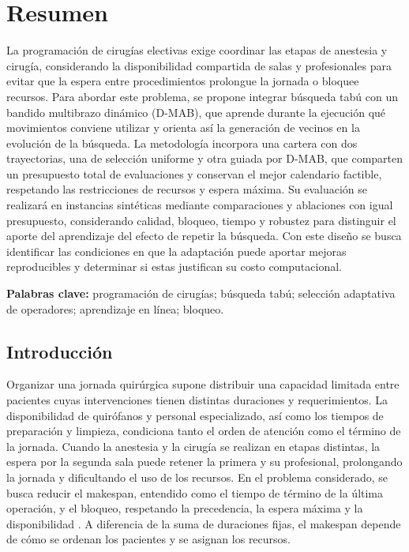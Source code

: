 \documentclass[12pt,letterpaper]{report}
\begin{document}
\hypersetup{pageanchor=false}

\hypersetup{pageanchor=true}

\chapter*{Resumen}
La programación de cirugías electivas exige coordinar las etapas de anestesia
y cirugía, considerando la disponibilidad compartida de salas y profesionales
para evitar que la espera entre procedimientos prolongue la jornada o bloquee
recursos. Para abordar este problema, se propone integrar búsqueda tabú con
un bandido multibrazo dinámico (D-MAB), que aprende durante la ejecución qué
movimientos conviene utilizar y orienta así la generación de vecinos en la
evolución de la búsqueda. La metodología incorpora una cartera con dos
trayectorias, una de selección uniforme y otra guiada por D-MAB, que comparten
un presupuesto total de evaluaciones y conservan el mejor calendario factible,
respetando las restricciones de recursos y espera máxima. Su evaluación se
realizará en instancias sintéticas mediante comparaciones y ablaciones con
igual presupuesto, considerando calidad, bloqueo, tiempo y robustez para
distinguir el aporte del aprendizaje del efecto de repetir la búsqueda.
Con este diseño se busca identificar las condiciones en que la adaptación
puede aportar mejoras reproducibles y determinar si estas justifican su
costo computacional.

\noindent\textbf{Palabras clave:} programación de cirugías; búsqueda tabú;
selección adaptativa de operadores; aprendizaje en línea; bloqueo.

\clearpage
\section{Introducción}
Organizar una jornada quirúrgica supone distribuir una capacidad limitada
entre pacientes cuyas intervenciones tienen distintas duraciones y
requerimientos. La disponibilidad de quirófanos y personal especializado,
así como los tiempos de preparación y limpieza, condiciona tanto el orden
de atención como el término de la jornada. Cuando la anestesia y la cirugía se realizan en
etapas distintas, la espera por la segunda sala puede retener la primera
y su profesional, prolongando la jornada y dificultando el uso de los
recursos. En el problema considerado, se busca reducir el makespan,
entendido como el tiempo de término de la última operación, y el bloqueo,
respetando la precedencia, la espera máxima y la disponibilidad
\parencite{lara2026}. A diferencia de la suma de duraciones fijas, el
makespan depende de cómo se ordenan los pacientes y se asignan los recursos.
\end{document}
